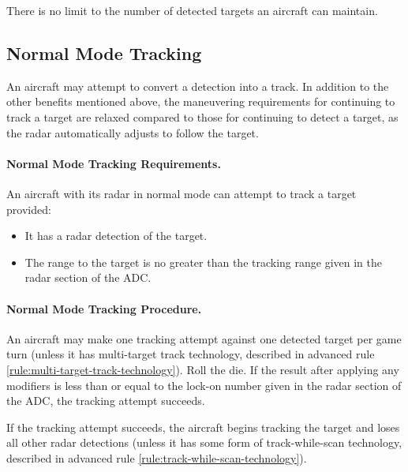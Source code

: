 {There is no limit to the number of detected targets an aircraft can maintain.

\subsection{Normal Mode Tracking}
\label{rule:normal-mode-tracking}


An aircraft may attempt to convert a detection into a track. In addition to the other benefits mentioned above, the maneuvering requirements for continuing to track a target are relaxed compared to those for continuing to detect a target, as the radar automatically adjusts to follow the target.

\paragraph{Normal Mode Tracking Requirements.} An aircraft with its radar in normal mode can attempt to track a target provided:
\begin{itemize}
\item It has a radar detection of the target.
\item The range to the target is no greater than the tracking range given in the radar section of the ADC. 
\end{itemize}

\paragraph{Normal Mode Tracking Procedure.} An aircraft may make one tracking attempt against one detected target per game turn (unless it has multi-target track technology, described in advanced rule \ref{rule:multi-target-track-technology}). Roll the die. If the result after applying any modifiers is less than or equal to the lock-on number given in the radar section of the ADC, the tracking attempt succeeds. 

If the tracking attempt succeeds, the aircraft begins tracking the target and loses all other radar detections (unless it has some form of track-while-scan technology, described in advanced rule \ref{rule:track-while-scan-technology}).

}
